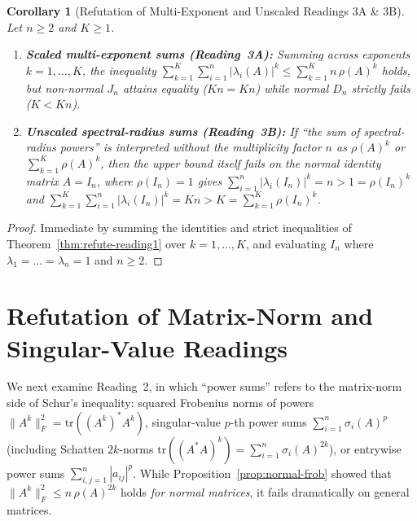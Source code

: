 \documentclass[11pt,a4paper]{article}
\theoremstyle{plain}
\newtheorem{corollary}[theorem]{Corollary}
\theoremstyle{definition}
\newcommand{\tr}{\mathrm{tr}}
\begin{document}
\begin{corollary}[Refutation of Multi-Exponent and Unscaled Readings 3A \& 3B]\label{cor:multi-exp}
Let $n \ge 2$ and $K \ge 1$.
\begin{enumerate}
  \item[(a)] \textbf{Scaled multi-exponent sums (Reading~3A):} Summing across exponents $k = 1, \dots, K$, the inequality $\sum_{k=1}^K \sum_{i=1}^n |\lambda_i(A)|^k \le \sum_{k=1}^K n\,\rho(A)^k$ holds, but non-normal $J_n$ attains equality ($Kn = Kn$) while normal $D_n$ strictly fails ($K < Kn$).
  \item[(b)] \textbf{Unscaled spectral-radius sums (Reading~3B):} If ``the sum of spectral-radius powers'' is interpreted without the multiplicity factor $n$ as $\rho(A)^k$ or $\sum_{k=1}^K \rho(A)^k$, then the upper bound itself fails on the normal identity matrix $A = I_n$, where $\rho(I_n) = 1$ gives $\sum_{i=1}^n |\lambda_i(I_n)|^k = n > 1 = \rho(I_n)^k$ and $\sum_{k=1}^K \sum_{i=1}^n |\lambda_i(I_n)|^k = Kn > K = \sum_{k=1}^K \rho(I_n)^k$.
\end{enumerate}
\end{corollary}

\begin{proof}
Immediate by summing the identities and strict inequalities of Theorem~\ref{thm:refute-reading1} over $k = 1, \dots, K$, and evaluating $I_n$ where $\lambda_1 = \dots = \lambda_n = 1$ and $n \ge 2$.
\end{proof}

\section{Refutation of Matrix-Norm and Singular-Value Readings}

We next examine Reading~2, in which ``power sums'' refers to the matrix-norm side of Schur's inequality: squared Frobenius norms of powers $\|A^k\|_F^2 = \tr((A^k)^* A^k)$, singular-value $p$-th power sums $\sum_{i=1}^n \sigma_i(A)^p$ (including Schatten $2k$-norms $\tr((A^* A)^k) = \sum_{i=1}^n \sigma_i(A)^{2k}$), or entrywise power sums $\sum_{i,j=1}^n |a_{ij}|^p$. While Proposition~\ref{prop:normal-frob} showed that $\|A^k\|_F^2 \le n\,\rho(A)^{2k}$ holds \emph{for normal matrices}, it fails dramatically on general matrices.
\end{document}
